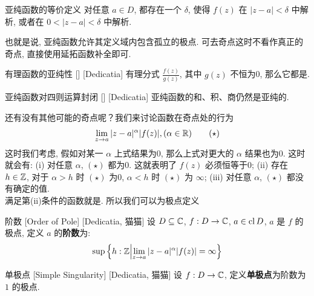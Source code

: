         \begin{ppt}
            {亚纯函数的等价定义}
            对任意 \(a\in D\), 都存在一个 \(\delta\), 使得 \(f(z)\) 在 \(|z-a|<\delta\) 中解析, 或者在 \(0<|z-a|<\delta\) 中解析. 
        \end{ppt}

        \begin{rmk}
            [Dedicatia]
            也就是说, 亚纯函数允许其定义域内包含孤立的极点. 可去奇点这时不看作真正的奇点, 直接使用延拓函数补全即可. 
        \end{rmk}

        \begin{crl}
            {有理函数的亚纯性}
            []
            [Dedicatia]
            有理分式 \(\frac{f(z)}{g(z)}\), 其中 \(g(z)\) 不恒为0, 那么它都是\Meromorphic{}.
        \end{crl}

        \begin{ppt}
            {亚纯函数对四则运算封闭}
            []
            [Dedicatia]
            亚纯函数的和、积、商仍然是亚纯的. 
        \end{ppt}

        还有没有其他可能的奇点呢？我们来讨论函数在奇点处的行为
        \[\lim_{z\to a}|z-a|^\alpha |f(z)|, (\alpha\in\operatorname{\mathbb{R}})\tag{\(\star\)}\]
        这时我们考虑, 假如对某一 \(\alpha\) 上式结果为0, 那么上式对更大的 \(\alpha\) 结果也为0. 这时就会有: (i) 对任意 \(\alpha\),  \((\star)\) 都为0. 这就表明了 \(f(z)\) 必须恒等于0; (ii) 存在 \(h\in\operatorname{\mathbb{Z}}\), 对于 \(\alpha>h\) 时 \((\star)\) 为0,  \(\alpha<h\) 时 \((\star)\) 为 \(\infty\); (iii) 对任意 \(\alpha\),  \((\star)\) 都没有确定的值. \\
        满足第(ii)条件的函数就是\Meromorphic{}. 所以我们可以为极点定义

        \begin{dfn}
            {阶数}
            [Order of Pole]
            [Dedicatia, 猫猫]
            设 \(D\subseteq\operatorname{\mathbb{C}}\), \(f:D\to\operatorname{\mathbb{C}}\), \(a\in\operatorname{cl} D\), \(a\) 是 \(f\) 的极点, 定义 \(a\) 的\textbf{阶数}为: 
            \[\sup\left\{h:\operatorname{\mathbb{Z}}\middle|\lim_{z\to a}|z-a|^\alpha |f(z)|=\infty\right\}\]
        \end{dfn}

        \begin{dfn}
            {单极点}
            [Simple Singularity]
            [Dedicatia, 猫猫]
            设 \(f:D\to\operatorname{\mathbb{C}}\), 定义\textbf{单极点}为阶数为 \(1\) 的极点. 
        \end{dfn}

